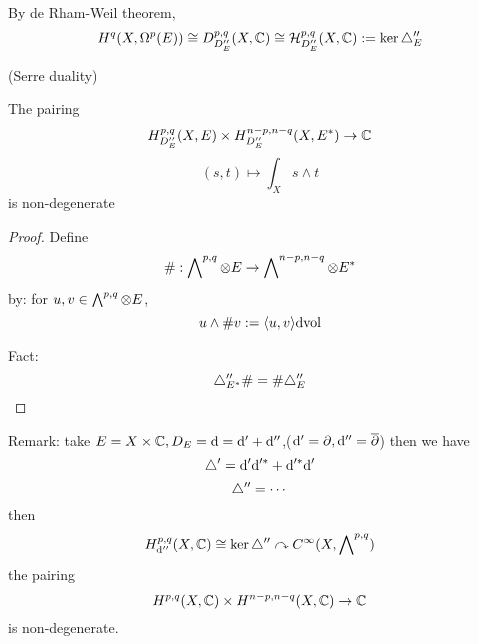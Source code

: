 By de Rham-Weil theorem,
$$H^q(X,\Omega^p(E))\cong D^{p,q}_{D_E''}(X,\mathbb{C})
\cong \mathcal{H}^{p,q}_{D_E''}(X,\mathbb{C}):=\ker\triangle_E''$$

\begin{thm}(Serre duality)

The pairing
$$H^{p,q}_{D_E''}(X,E)
\times H^{n-p,n-q}_{D_E''}(X,E^*)\to\mathbb{C}$$
$$(s,t)\mapsto\int_X s\wedge t$$
is non-degenerate
\end{thm}

\begin{proof}Define
$$\#:\bigwedge\nolimits^{p,q}\otimes E\to \bigwedge\nolimits^{n-p,n-q}\otimes E^*$$
by: for $u,v\in\bigwedge\nolimits^{p,q}\otimes E$,
$$u\wedge\# v:=\langle u,v \rangle\mathrm{d}\text{vol}$$

Fact:
$$\triangle_{E^*}''\#=\#\triangle_E''$$
\end{proof}

Remark: take $E=X\times \mathbb{C},D_E=\mathrm{d}=\mathrm{d}'+\mathrm{d}''$,($\mathrm{d}'=\partial,\mathrm{d}''=\overline{\partial}$)
 then we have
 $$\triangle'=\mathrm{d}'\mathrm{d}'^*+\mathrm{d}'^*\mathrm{d}'$$
 $$\triangle''=\cdots$$
then
$$H^{p,q}_{\mathrm{d}''}(X,\mathbb{C})\cong\ker\triangle''\curvearrowright C^\infty(X,\bigwedge\nolimits^{p,q})$$
the pairing
$$H^{p,q}(X,\mathbb{C})\times H^{n-p,n-q}(X,\mathbb{C})\to\mathbb{C}$$
is non-degenerate.



















